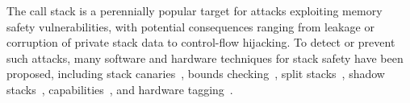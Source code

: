 \documentclass[acmsmall,review,anonymous]{acmart}\settopmatter{printfolios=true,printccs=false,printacmref=false}
\begin{document}
\newcommand*{\MemoryLabel}[3]{\raisebox{#2}{\makebox(0,0){\hspace{#1}#3}}}

%

The call stack is a perennially popular target for attacks
exploiting memory safety vulnerabilities, with potential consequences
ranging from leakage or corruption of private stack data to
control-flow hijacking. To detect or prevent such attacks, many
software and hardware techniques for stack safety have been proposed,
%
including stack canaries~\citep{Cowan+98},
bounds checking~\citep{NagarakatteZMZ09,NagarakatteZMZ10,DeviettiBMZ08},
split stacks~\citep{Kuznetsov+14},
shadow stacks~\citep{Dang+15,Shanbhogue+19},
capabilities~\citep{Woodruff+14,Chisnall+15,Skorstengaard+19,Skorstengaard+19b},
and hardware tagging~\citep{DBLP:conf/sp/RoesslerD18}. 
\end{document}

